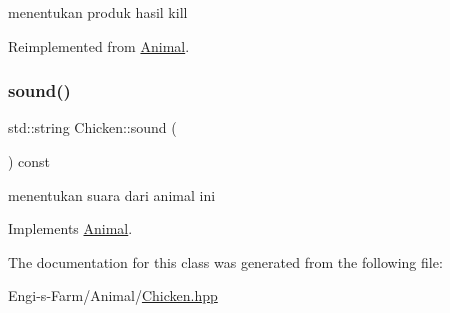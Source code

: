 menentukan produk hasil kill 

Reimplemented from \mbox{\hyperlink{class_animal_a4d4e70aed7f889574600e8492f419948}{Animal}}.

\mbox{\label{class_chicken_a2ea0957d2902deeb06bb88e2a663b525}} 
\subsubsection{\texorpdfstring{sound()}{sound()}}
{\footnotesize\ttfamily std\+::string Chicken\+::sound (\begin{DoxyParamCaption}{ }\end{DoxyParamCaption}) const\hspace{0.3cm}{\ttfamily [virtual]}}

menentukan suara dari animal ini 

Implements \mbox{\hyperlink{class_animal_aca8216576b21b87f761a34686a4968a8}{Animal}}.



The documentation for this class was generated from the following file\+:\begin{DoxyCompactItemize}
\item 
Engi-\/s-\/\+Farm/\+Animal/\mbox{\hyperlink{_chicken_8hpp}{Chicken.\+hpp}}\end{DoxyCompactItemize}
